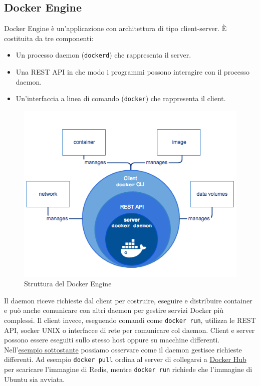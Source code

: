 \subsection{Docker Engine}
Docker Engine è un'applicazione con architettura di tipo client-server. È costituita da tre componenti:
\begin{itemize}
    \item Un processo daemon (\verb|dockerd|) che rappresenta il server.
    \item Una REST API in che modo i programmi possono interagire con il processo daemon.
    \item Un'interfaccia a linea di comando (\verb|docker|) che rappresenta il client.
\end{itemize}
\begin{figure}[h]
    \centering
    \includegraphics[scale=0.5]{immagini/engine-components-flow.png}
    \caption{Struttura del Docker Engine}
    \label{fig:docker-engine}
\end{figure}
Il daemon riceve richieste dal client per costruire, eseguire e distribuire container e può anche comunicare con altri daemon per gestire servizi Docker più complessi. Il client invece, eseguendo comandi come \verb|docker run|, utilizza le REST API, socker UNIX o interfacce di rete per comunicare col daemon. Client e server possono essere eseguiti sullo stesso host oppure su macchine differenti. Nell'\hyperref[fig:docker-architecture-example]{esempio sottostante} possiamo osservare come il daemon gestisce richieste differenti. Ad esempio \verb|docker pull| ordina al server di collegarsi a \hyperref[docker-hub]{Docker Hub} per scaricare l'immagine di Redis, mentre \verb|docker run| richiede che l'immagine di Ubuntu sia avviata.

